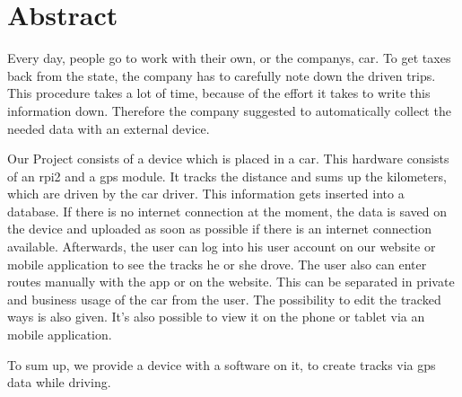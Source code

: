 \chapter*{Abstract}
Every day, people go to work with their own, or the companys, car. To get taxes back from the state, the company has to carefully note down the driven trips. This procedure takes a lot of time,  because of the effort it takes to write this information down. Therefore the company suggested to automatically collect the needed data with an external device.\newline

Our Project consists of a device which is placed in a car. This hardware consists of an \gls{rpi2} and a \gls{gps} module. It tracks the distance and sums up the kilometers, which are driven by the car driver. This information gets inserted into a database. If there is no internet connection at the moment, the data is saved on the device and uploaded as soon as possible if there is an internet connection available. Afterwards, the user can log into his user account on our website or mobile application to see the tracks he or she drove. The user also can enter routes manually with the app or on the website. This can be separated in private and business usage of the car from the user. The possibility to edit the tracked ways is also given. It's also possible to view it on the phone or tablet via an mobile application.\newline

To sum up, we provide a device with a software on it, to create tracks via \gls{gps} data while driving.
